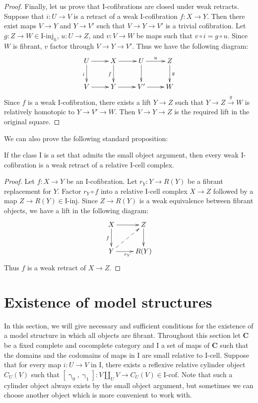 \documentclass{tac}
\theoremstyle{definition}
\newcommand{\cat}[1]{\mathbf{#1}}
\newcommand{\C}{\cat{C}}
\newcommand{\I}{\mathrm{I}}
\newcommand{\class}[2]{#1\text{-}\mathrm{#2}}
\newcommand{\Iinj}[1][\I]{\class{#1}{inj}}
\newcommand{\Icell}[1][\I]{\class{#1}{cell}}
\newcommand{\Icof}[1][\I]{\class{#1}{cof}}
\newcommand{\cyli}{\upgamma}
\begin{document}
\begin{proof}
Finally, let us prove that $\I$-cofibrations are closed under weak retracts.
Suppose that $i : U \to V$ is a retract of a weak $\I$-cofibration $f : X \to Y$.
Then there exist maps $V \to Y$ and $Y \to V'$ such that $V \to Y \to V'$ is a trivial cofibration.
Let $g : Z \to W \in \Iinj_h$, $u : U \to Z$, and $v : V \to W$ be maps such that $v \circ i = g \circ u$.
Since $W$ is fibrant, $v$ factor through $V \to Y \to V'$.
Thus we have the following diagram:
\[ \xymatrix{ U \ar[r] \ar[d]_i & X \ar[r] \ar[d]_f & U \ar[r]^u \ar[d] & Z \ar[d]^g \\
              V \ar[r]          & Y \ar[r]          & V' \ar[r]         & W
            } \]
Since $f$ is a weak $\I$-cofibration, there exists a lift $Y \to Z$ such that $Y \to Z \xrightarrow{g} W$ is relatively homotopic to $Y \to V' \to W$.
Then $V \to Y \to Z$ is the required lift in the original square.
\end{proof}

We can also prove the following standard proposition:

\begin{prop}
If the class $\I$ is a set that admits the small object argument, then every weak $\I$-cofibration is a weak retract of a relative $\I$-cell complex.
\end{prop}
\begin{proof}
Let $f : X \to Y$ be an $\I$-cofibration.
Let $r_Y : Y \to R(Y)$ be a fibrant replacement for $Y$.
Factor $r_Y \circ f$ into a relative $\I$-cell complex $X \to Z$ followed by a map $Z \to R(Y) \in \Iinj$.
Since $Z \to R(Y)$ is a weak equivalence between fibrant objects, we have a lift in the following diagram:
\[ \xymatrix{ X \ar[r] \ar[d]_f             & Z \ar[d] \\
              Y \ar[r]_{r_Y} \ar@{-->}[ur]  & R(Y)
            } \]
Thus $f$ is a weak retract of $X \to Z$.
\end{proof}

\section{Existence of model structures}
\label{sec:exist}

In this section, we will give necessary and sufficient conditions for the existence of a model structure in which all objects are fibrant.
Throughout this section let $\C$ be a fixed complete and cocomplete category and $\I$ a set of maps of $\C$
such that the domains and the codomains of maps in $\I$ are small relative to $\Icell$.
Suppose that for every map $i : U \to V$ in $\I$, there exists a reflexive relative cylinder object $C_U(V)$ such that $[\cyli_0,\cyli_1] : V \amalg_U V \to C_U(V) \in \Icof$.
Note that such a cylinder object always exists by the small object argument, but sometimes we can choose another object which is more convenient to work with.
\end{document}
